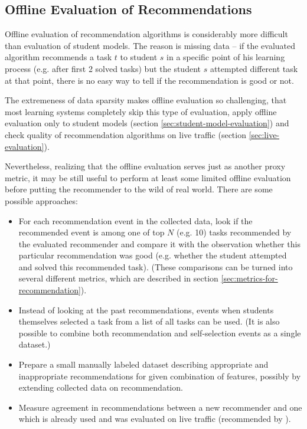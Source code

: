 
\subsection{Offline Evaluation of Recommendations}


Offline evaluation of recommendation algorithms is considerably more difficult
  than evaluation of student models.
The reason is missing data --
  if the evaluated algorithm recommends a task $t$ to student $s$
  in a specific point of his learning process (e.g. after first 2 solved tasks)
  but the student $s$ attempted different task at that point,
  there is no easy way to tell if the recommendation is good or not.

The extremeness of data sparsity makes offline evaluation so challenging,
that most learning systems completely skip this type of evaluation,
apply offline evaluation only to student models
(section \ref{sec:student-model-evaluation})
and check quality of recommendation algorithms on live traffic
(section \ref{sec:live-evaluation}).

Nevertheless, realizing that the offline evaluation serves just as another proxy metric,
  it may be still useful to perform at least some limited offline evaluation
  before putting the recommender to the wild of real world.
There are some possible approaches:
\begin{itemize}
  \item For each recommendation event in the collected data,
      look if the recommended event is among one of top $N$ (e.g. 10) tasks
      recommended by the evaluated recommender
      and compare it with the observation whether this particular recommendation
      was good (e.g. whether the student attempted and solved this recommended task).
      (These comparisons can be turned into several different metrics,
       which are described in section \ref{sec:metrics-for-recommendation}).
  \item Instead of looking at the past recommendations,
      events when students themselves selected a task from a list of all tasks can be used.
      (It is also possible to combine both recommendation and self-selection events
       as a single dataset.)
  \item Prepare a small manually labeled dataset describing appropriate and
    inappropriate recommendations for given combination of features, possibly
    by extending collected data on recommendation.
  \item Measure agreement in recommendations between a new recommender and one which is already used and was evaluated on live traffic (recommended by \cite[][Rule \#24]{google-ml-rules}).
\end{itemize}

